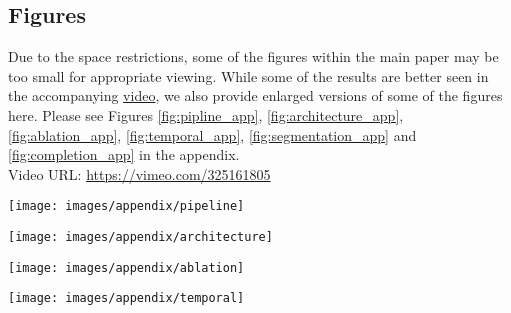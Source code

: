 \documentclass[10pt,twocolumn,letterpaper]{article}
\begin{document}
{\subsection{Figures}

Due to the space restrictions, some of the figures within the main paper may be too small for appropriate viewing. While some of the results are better seen in the accompanying \href{https://vimeo.com/325161805}{video}, we also provide enlarged versions of some of the figures here. Please see Figures \ref{fig:pipline_app}, \ref{fig:architecture_app}, \ref{fig:ablation_app}, \ref{fig:temporal_app}, \ref{fig:segmentation_app} and \ref{fig:completion_app} in the appendix.
\\
Video URL: \href{https://vimeo.com/325161805}{https://vimeo.com/325161805}
\begin{figure*}[t!]
	\centering
	\texttt{[image: images/appendix/pipeline]}
	\captionsetup[figure]{skip=7pt}
	\label{fig:pipline_app}\vspace{-0.4cm}
\end{figure*}
\begin{figure*}[t!]
	\centering
	\texttt{[image: images/appendix/architecture]}
	\captionsetup[figure]{skip=7pt}
	\label{fig:architecture_app}\vspace{-0.4cm}
\end{figure*}
\begin{figure*}[t!]
	\centering
	\texttt{[image: images/appendix/ablation]}
	\captionsetup[figure]{skip=7pt}
	\label{fig:ablation_app}\vspace{-0.4cm}
\end{figure*}
\begin{figure*}[t!]
	\centering
	\texttt{[image: images/appendix/temporal]}
	\captionsetup[figure]{skip=7pt}
	\label{fig:temporal_app}\vspace{-0.4cm}

\end{figure*}}
\end{document}
